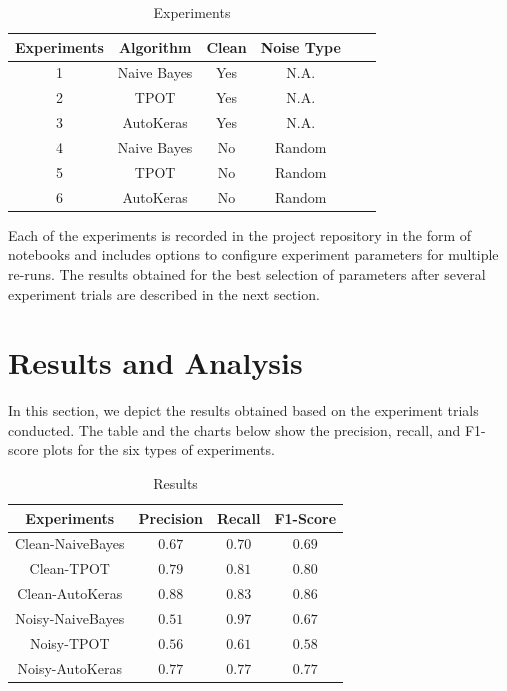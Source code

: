 \documentclass{article}
\begin{document}
\begin{table}[H]
    \centering
    \begin{tabular}{cccccc}
    \hline
        Experiments & Algorithm & Clean & Noise Type \\ \hline
        1 & Naive Bayes & Yes & N.A.\\ \hline
        2 & TPOT & Yes & N.A.\\ \hline
        3 & AutoKeras & Yes & N.A.\\ \hline
        4 & Naive Bayes & No & Random\\ \hline
        5 & TPOT & No & Random\\ \hline
        6 & AutoKeras & No & Random\\ \hline
    \end{tabular}
    \caption{Experiments}
    \label{tab:experiments}
\end{table}

Each of the experiments is recorded in the project repository in the form of notebooks and includes options to configure experiment parameters for multiple re-runs. The results obtained for the best selection of parameters after several experiment trials are described in the next section.  

\section {Results and Analysis}
In this section, we depict the results obtained based on the experiment trials conducted. The table and the charts below show the precision, recall, and F1-score plots for the six types of experiments.

\begin{table}[H]
    \centering
    \begin{tabular}{cccc}
    \hline
        Experiments & Precision & Recall & F1-Score \\ \hline
        Clean-NaiveBayes & $0.67$ & $0.70$ & $0.69$\\ \hline
        Clean-TPOT & $0.79$ & $0.81$ & $0.80$\\ \hline
        Clean-AutoKeras & $0.88$ & $0.83$ & $0.86$\\ \hline
        Noisy-NaiveBayes & $0.51$ & $0.97$ & $0.67$\\ \hline
        Noisy-TPOT & $0.56$ & $0.61$ & $0.58$\\ \hline
        Noisy-AutoKeras & $0.77$ & $0.77$ & $0.77$\\ \hline
    \end{tabular}
    \caption{Results}
    \label{tab:results}
\end{table}
\end{document}
